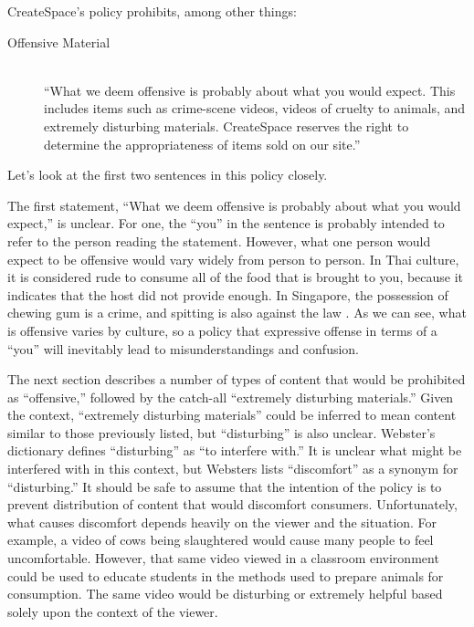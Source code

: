 \documentclass[11pt]{article}
\begin{document}
\begin{multicols}{2}
CreateSpace's policy prohibits, among other things:

\begin{description}
\item[Offensive Material] \hfill \\
      ``What we deem offensive is probably about what you would expect. This includes items such as crime-scene videos, videos of cruelty to animals, and extremely disturbing materials. CreateSpace reserves the right to determine the appropriateness of items sold on our site.'' \cite{CreateSpaceContentGuidelines}

\end{description}

Let's look at the first two sentences in this policy closely.

The first statement, ``What we deem offensive is probably about what you would expect,'' is unclear.  For one, the ``you'' in the sentence is probably intended to refer to the person reading the statement.  However, what one person would expect to be offensive would vary widely from person to person.  In Thai culture, it is considered rude to consume all of the food that is brought to you, because it indicates that the host did not provide enough. \cite{EHowThai}  In Singapore, the possession of chewing gum is a crime, and spitting is also against the law \cite{HotelTravelSingapore}.  As we can see, what is offensive varies by culture, so a policy that expressive offense in terms of a ``you'' will inevitably lead to misunderstandings and confusion.

The next section describes a number of types of content that would be prohibited as ``offensive,'' followed by the catch-all ``extremely disturbing materials.'' Given the context, ``extremely disturbing materials'' could be inferred to mean content similar to those previously listed, but ``disturbing'' is also unclear.  Webster's dictionary defines ``disturbing'' as ``to interfere with.'' \cite{WebsterOnlineDict}  It is unclear what might be interfered with in this context, but Websters lists ``discomfort'' as a synonym for ``disturbing.'' \cite{WebsterOnlineDict}  It should be safe to assume that the intention of the policy is to prevent distribution of content that would discomfort consumers.  Unfortunately, what causes discomfort depends heavily on the viewer and the situation.  For example, a video of cows being slaughtered would cause many people to feel uncomfortable.  However, that same video viewed in a classroom environment could be used to educate students in the methods used to prepare animals for consumption.  The same video would be disturbing or extremely helpful based solely upon the context of the viewer. 


\end{multicols}
\end{document}
